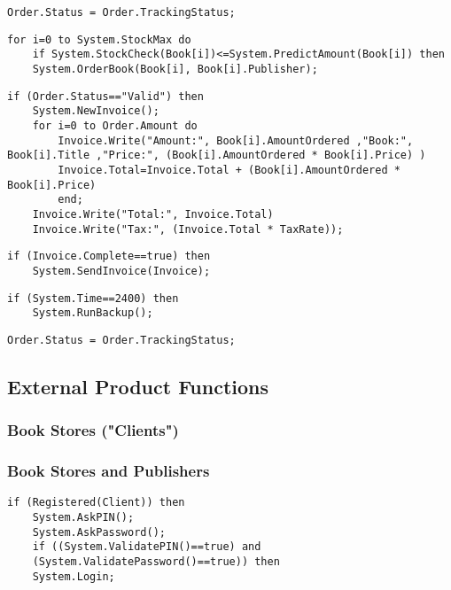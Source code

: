 \documentclass[12pt,a4paper]{article}
\begin{document}
\begin{lstlisting}[caption=/PF15/ Confirm Delivery]
 Order.Status = Order.TrackingStatus;
\end{lstlisting}
\begin{lstlisting}[caption=/PF16/ BookExpress Order]
 for i=0 to System.StockMax do
 	if System.StockCheck(Book[i])<=System.PredictAmount(Book[i]) then
 	System.OrderBook(Book[i], Book[i].Publisher);
\end{lstlisting}
\begin{lstlisting}[caption=/PF20/ Create Invoice]
if (Order.Status=="Valid") then
	System.NewInvoice();
	for i=0 to Order.Amount do 
		Invoice.Write("Amount:", Book[i].AmountOrdered ,"Book:", Book[i].Title ,"Price:", (Book[i].AmountOrdered * Book[i].Price) )
		Invoice.Total=Invoice.Total + (Book[i].AmountOrdered * Book[i].Price)
		end;
	Invoice.Write("Total:", Invoice.Total)
	Invoice.Write("Tax:", (Invoice.Total * TaxRate));
\end{lstlisting}
\begin{lstlisting}[caption=/PF21/ Send Invoice]
  if (Invoice.Complete==true) then 
  	System.SendInvoice(Invoice);
\end{lstlisting}
\begin{lstlisting}[caption=/PF30/ Backup]
 if (System.Time==2400) then
 	System.RunBackup();
\end{lstlisting}
\begin{lstlisting}[caption=/PF15/ Confirm Delivery]
 Order.Status = Order.TrackingStatus;
\end{lstlisting}

\subsection{External Product Functions}
\subsubsection{Book Stores ("Clients")}
\subsubsection{Book Stores and Publishers}

\begin{lstlisting}[caption=/PF03/ Login]
 if (Registered(Client)) then
 	System.AskPIN();
 	System.AskPassword();
 	if ((System.ValidatePIN()==true) and
 	(System.ValidatePassword()==true)) then
 	System.Login;
\end{lstlisting}
\end{document}
